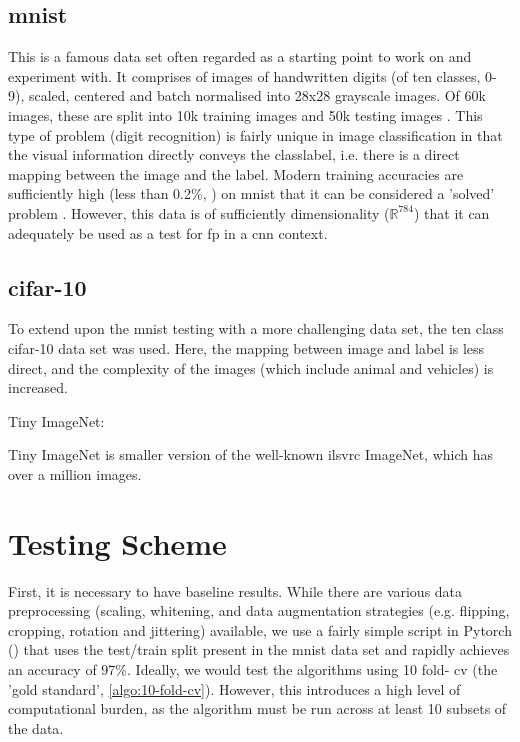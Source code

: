  \subsection{\gls{mnist}}
 
 This is a famous data set often regarded as a starting point to work on and experiment with. It comprises of images of handwritten digits (of ten classes, 0-9), scaled, centered and batch normalised into 28x28 grayscale images. Of 60k images, these are split into 10k training images and 50k testing images \cite{mnist}. This type of problem (digit recognition) is fairly unique in image classification in that the visual information directly conveys the \gls{classlabel}, i.e. there is a direct mapping between the image and the label. Modern training accuracies are sufficiently high (less than 0.2\%, \cite{mnist_sota}) on \gls{mnist} that it can be considered a 'solved' problem \cite{mnist_sota_web}. However, this data is of sufficiently dimensionality ($\mathds{R}^{784}$) that it can adequately be used as a test for \gls{fp} in a \gls{cnn} context. 
 \bigskip

\subsection{\gls{cifar}-10}

To extend upon the \gls{mnist} testing with a more challenging data set, the ten class \gls{cifar}-10 data set was used. Here, the mapping between image and label is less direct, and the complexity of the images (which include animal and vehicles) is increased.
\bigskip

Tiny ImageNet:

Tiny ImageNet is smaller version of the well-known \gls{ilsvrc} ImageNet, which has over a million images.

\section{Testing Scheme}

First, it is necessary to have baseline results. While there are various data preprocessing (scaling, whitening,  and data augmentation strategies (e.g. flipping, cropping, rotation and jittering)  available, we use a fairly simple script in Pytorch (\cite{mnist_script}) that uses the test/train split present in the  \gls{mnist} data set and rapidly achieves an accuracy of 97\%. Ideally, we would test the algorithms using 10 fold- \gls{cv} (the 'gold standard', \ref{algo:10-fold-cv}). However, this introduces a high level of computational burden, as the algorithm must be run across at least 10 subsets of the data. 
\bigskip


